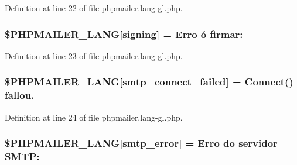 Definition at line 22 of file phpmailer.\+lang-\/gl.\+php.

\subsubsection[{\texorpdfstring{\$\+P\+H\+P\+M\+A\+I\+L\+E\+R\+\_\+\+L\+A\+NG}{$PHPMAILER_LANG}}]{\setlength{\rightskip}{0pt plus 5cm}\$P\+H\+P\+M\+A\+I\+L\+E\+R\+\_\+\+L\+A\+NG\mbox{[}\textquotesingle{}signing\textquotesingle{}\mbox{]} = \textquotesingle{}Erro ó firmar\+: \textquotesingle{}}\hypertarget{phpmailer_8lang-gl_8php_a68e437bdb9b968a5a67320f03d231565}{}\label{phpmailer_8lang-gl_8php_a68e437bdb9b968a5a67320f03d231565}


Definition at line 23 of file phpmailer.\+lang-\/gl.\+php.

\subsubsection[{\texorpdfstring{\$\+P\+H\+P\+M\+A\+I\+L\+E\+R\+\_\+\+L\+A\+NG}{$PHPMAILER_LANG}}]{\setlength{\rightskip}{0pt plus 5cm}\$P\+H\+P\+M\+A\+I\+L\+E\+R\+\_\+\+L\+A\+NG\mbox{[}\textquotesingle{}smtp\+\_\+connect\+\_\+failed\textquotesingle{}\mbox{]} =  Connect() fallou.\textquotesingle{}}\hypertarget{phpmailer_8lang-gl_8php_a7b321d4ca1e9df702403ed4c61aa0980}{}\label{phpmailer_8lang-gl_8php_a7b321d4ca1e9df702403ed4c61aa0980}


Definition at line 24 of file phpmailer.\+lang-\/gl.\+php.

\subsubsection[{\texorpdfstring{\$\+P\+H\+P\+M\+A\+I\+L\+E\+R\+\_\+\+L\+A\+NG}{$PHPMAILER_LANG}}]{\setlength{\rightskip}{0pt plus 5cm}\$P\+H\+P\+M\+A\+I\+L\+E\+R\+\_\+\+L\+A\+NG\mbox{[}\textquotesingle{}smtp\+\_\+error\textquotesingle{}\mbox{]} = \textquotesingle{}Erro do servidor S\+M\+T\+P\+: \textquotesingle{}}\hypertarget{phpmailer_8lang-gl_8php_a7d9cffba1e669c845f8a4c891ee50064}{}\label{phpmailer_8lang-gl_8php_a7d9cffba1e669c845f8a4c891ee50064}


